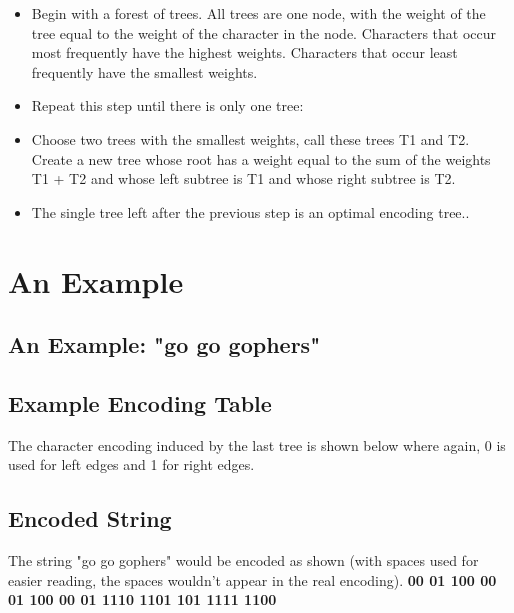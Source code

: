 \documentclass[12pt]{report}
\begin{document}
\begin{itemize}

\item Begin with a forest of trees. All trees are one node, with the weight of the tree equal to the weight of the character in the node. Characters that occur most frequently have the highest weights. Characters that occur least frequently have the smallest weights.
\item    Repeat this step until there is only one tree:
\item    Choose two trees with the smallest weights, call these trees T1 and T2. Create a new tree whose root has a weight equal to the sum of the weights T1 + T2 and whose left subtree is T1 and whose right subtree is T2.
\item    The single tree left after the previous step is an optimal encoding tree..

\end{itemize}

\section{An Example}

\subsection{An Example: "go go gophers"}


\subsection{Example Encoding Table}

The character encoding induced by the last tree is shown below where again, 0 is used for left edges and 1 for right edges.

\begin{figure}[h!]
	\centering
\end{figure}

\subsection{Encoded String}

The string "go go gophers" would be encoded as shown (with spaces used for easier reading, the spaces wouldn't appear in the real encoding).
\textbf{00 01 100 00 01 100 00 01 1110 1101 101 1111 1100}
\end{document}
